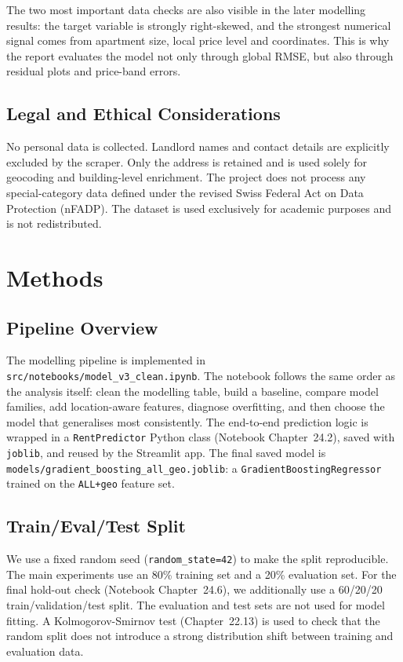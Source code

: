 \documentclass[11pt,a4paper]{article}
\begin{document}
The two most important data checks are also visible in the later modelling results: the target variable is strongly right-skewed, and the strongest numerical signal comes from apartment size, local price level and coordinates. This is why the report evaluates the model not only through global RMSE, but also through residual plots and price-band errors.



\subsection{Legal and Ethical Considerations}
No personal data is collected. Landlord names and contact details are explicitly excluded by the scraper. Only the address is retained and is used solely for geocoding and building-level enrichment. The project does not process any special-category data defined under the revised Swiss Federal Act on Data Protection (nFADP). The dataset is used exclusively for academic purposes and is not redistributed.

\section{Methods}
\label{sec:methods}

\subsection{Pipeline Overview}
The modelling pipeline is implemented in \texttt{src/notebooks/model\_v3\_clean.ipynb}. The notebook follows the same order as the analysis itself: clean the modelling table, build a baseline, compare model families, add location-aware features, diagnose overfitting, and then choose the model that generalises most consistently. The end-to-end prediction logic is wrapped in a \texttt{RentPredictor} Python class (Notebook Chapter~24.2), saved with \texttt{joblib}, and reused by the Streamlit app. The final saved model is \texttt{models/gradient\_boosting\_all\_geo.joblib}: a \texttt{GradientBoostingRegressor} trained on the \texttt{ALL+geo} feature set.

\subsection{Train/Eval/Test Split}
We use a fixed random seed (\texttt{random\_state=42}) to make the split reproducible. The main experiments use an 80\% training set and a 20\% evaluation set. For the final hold-out check (Notebook Chapter~24.6), we additionally use a 60/20/20 train/validation/test split. The evaluation and test sets are not used for model fitting. A Kolmogorov-Smirnov test (Chapter~22.13) is used to check that the random split does not introduce a strong distribution shift between training and evaluation data.
\end{document}
